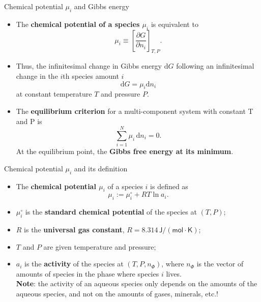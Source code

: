 %
%
\begin{frame}[<+->]{Chemical potential $\mu_{i}$ and Gibbs energy}
\begin{itemize}
\item The \alert{\bf chemical potential of a species $\mu_{i}$} is equivalent to
\[
\mu_{i}\equiv\left[\frac{\partial G}{\partial n_{i}}\right]_{T,P}.
\]
%
\item Thus, the infinitesimal change in Gibbs energy $\mathrm{d}G$ following an infinitesimal change in the $i$th species amount $i$ 
%
\[
\mathrm{d}G=\mu_{i}\mathrm{d}n_{i}
\]
at constant temperature $T$ and pressure $P$.
\item The \textbf{equilibrium criterion} for a multi-component system with constant T and P is
\[
\sum_{i=1}^N \mu_i \, \mathrm{d}n_{i} = 0.
\]
At the equilibrium point, the \textbf{Gibbs free energy at its minimum}.
%
\end{itemize}
\end{frame}
%
%
\begin{frame}{Chemical potential $\mu_{i}$ and its definition}
\begin{itemize}
\item The \alert{\textbf{chemical potential $\mu_{i}$}} of a species $i$ is defined as
\[
\boxed{
\mu_{i}:=\mu_{i}^{\circ}+RT\ln a_{i}.
}
\]
\vskip -10pt
%
\pause
\item $\mu_{i}^{\circ}$ is the \alert{\bf standard chemical potential} of
the species at $(T,P)$;
\pause
\item $R$ is the \alert{\bf universal gas constant}, $R= 8.314 \, \mathsf{J/(mol \cdot K)}$;
\pause
\item $T$ and $P$ are given temperature and pressure;
\pause
\item $a_{i}$ is the \alert{\bf activity} of the species at $(T,P,n_{\Phi})$,
where $n_{\Phi}$ is the vector of amounts of species in the phase
where species $i$ lives. \\
\textbf{Note}: the activity of an aqueous species only depends on the
amounts of the aqueous species, and not on the amounts of gases, minerals,
etc.!

\end{itemize}
\end{frame}

